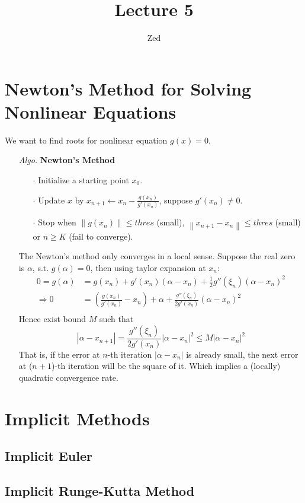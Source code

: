 \documentclass[a4paper, 11pt]{article}
\title{\textbf{Lecture 5}}
\author{Zed}
\begin{document}
\maketitle
\section{Newton's Method for Solving Nonlinear Equations}
We want to find roots for nonlinear equation $g(x)=0$. 
\begin{itemize}
	\item[\textit{Algo.}] \textbf{Newton's Method}
	\begin{itemize}
		\item[$\cdot$] Initialize a starting point $x_0$. 
		\item[$\cdot$] Update $x$ by $x_{n+1} \leftarrow x_n - \frac{g(x_n)}{g'(x_n)}$, suppose $g'(x_n)\ne 0$.
		\item[$\cdot$] Stop when $\left\|g(x_n)\right\| \leq thres$ (small), $\left\|x_{n+1} - x_n\right\| \leq thres$ (small) or $n\geq K$ (fail to converge). 
	\end{itemize}
	The Newton's method only converges in a local sense. Suppose the real zero is $\alpha$, s.t. $g(\alpha)=0$, then using taylor expansion at $x_n$:
	\begin{equation}
		 \begin{split}
		 	0 = g(\alpha) &= g(x_n) + g'(x_n)(\alpha - x_n) + \frac{1}{2}g''(\xi_n)(\alpha - x_n)^2 \\
		 	\Rightarrow 0 &= \left(\frac{g(x_n)}{g'(x_n)} - x_n\right) + \alpha + \frac{g''(\xi_n)}{2g'(x_n)}(\alpha - x_n)^2 \\
		 \end{split}
	\end{equation}
	Hence exist bound $M$ such that 
	$$
	|\alpha - x_{n+1}| = \frac{g''(\xi_n)}{2g'(x_n)}|\alpha - x_n|^2 \leq M|\alpha - x_n|^2
	$$
	That is, if the error at $n$-th iteration $|\alpha - x_n|$ is already small, the next error at ($n+1$)-th iteration will be the square of it. Which implies a (locally) quadratic convergence rate.
\end{itemize}
\section{Implicit Methods}
\subsection{Implicit Euler}
\subsection{Implicit Runge-Kutta Method}
\end{document}
